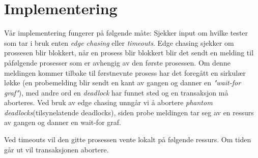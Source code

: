 \documentclass{article}
\begin{document}
\section{Implementering}
Vår implementering fungerer på følgende måte: Sjekker input om hvilke tester som tar i bruk enten \emph{edge chasing} eller \emph{timeouts}. Edge chasing sjekker om prossesen blir blokkert, når en prosess blir blokkert blir det sendt en melding til påfølgende prosesser som er avhengig av den første prosessen. Om denne meldingen kommer tilbake til førstnevnte prosess har det foregått en sirkulær løkke (en probemelding blir sendt en kant av gangen og danner en \emph{"wait-for graf"}), med andre ord en \emph{deadlock} har funnet sted og en transaksjon må aborteres. Ved bruk av edge chasing unngår vi å abortere \emph{phantom deadlocks}(tilsynelatende deadlocks), siden probe meldingen tar seg av en ressurs av gangen og danner en wait-for graf. 

Ved timeouts vil den gitte prosessen vente lokalt på følgende ressurs. Om tiden går ut vil transaksjonen abortere. 
\end{document}
